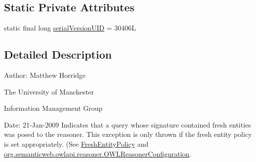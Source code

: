\subsection*{Static Private Attributes}
\begin{DoxyCompactItemize}
\item 
static final long \hyperlink{classorg_1_1semanticweb_1_1owlapi_1_1reasoner_1_1_fresh_entities_exception_aeaf992e33c80cb187e6e70914f1d9057}{serial\-Version\-U\-I\-D} = 30406\-L
\end{DoxyCompactItemize}


\subsection{Detailed Description}
Author\-: Matthew Horridge\par
 The University of Manchester\par
 Information Management Group\par
 Date\-: 21-\/\-Jan-\/2009 Indicates that a query whose signature contained fresh entities was posed to the reasoner. This exception is only thrown if the fresh entity policy is set appropriately. (See \hyperlink{enumorg_1_1semanticweb_1_1owlapi_1_1reasoner_1_1_fresh_entity_policy}{Fresh\-Entity\-Policy} and \hyperlink{interfaceorg_1_1semanticweb_1_1owlapi_1_1reasoner_1_1_o_w_l_reasoner_configuration}{org.\-semanticweb.\-owlapi.\-reasoner.\-O\-W\-L\-Reasoner\-Configuration}. 

